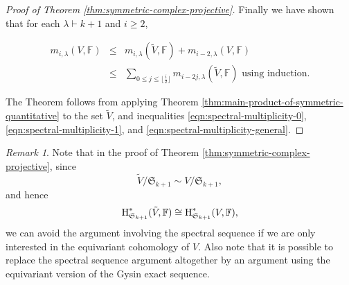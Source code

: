 \documentclass{amsart}
\theoremstyle{definition}
\theoremstyle{remark}
\newtheorem{remark}{Remark}
\numberwithin{equation}{section}
\begin{document}
\begin{proof}[Proof of Theorem \ref{thm:symmetric-complex-projective}]
Finally we have shown that for each $\lambda \vdash k+1$ and $i \geq 2$,
 
\begin{eqnarray}
\label{eqn:spectral-multiplicity-general}
 m_{i,\lambda}(V,{\mathbb{F}}) &\leq& m_{i,\lambda}(\tilde{V},{\mathbb{F}}) + m_{i-2,\lambda}(V,{\mathbb{F}})  \nonumber\\
 				&\leq& \sum_{0\leq j \leq \lfloor \frac{i}{2}\rfloor } m_{i - 2j,\lambda}(\tilde{V},{\mathbb{F}}) \mbox{ using induction}. 
\end{eqnarray}
 
The Theorem follows from applying Theorem \ref{thm:main-product-of-symmetric-quantitative} to the set $\tilde{V}$, and 
inequalities \eqref{eqn:spectral-multiplicity-0}, \eqref{eqn:spectral-multiplicity-1}, and
\eqref{eqn:spectral-multiplicity-general}.
\end{proof}

\begin{remark}
Note that in the proof of Theorem \ref{thm:symmetric-complex-projective},
since
\[
\tilde{V}/\mathfrak{S}_{k+1} \sim V/\mathfrak{S}_{k+1},
\]
and hence
\[
{\mbox{\rm H}}^*_{\mathfrak{S}_{k+1}}(\tilde{V},{\mathbb{F}}) \cong {\mbox{\rm H}}^*_{\mathfrak{S}_{k+1}}(V,{\mathbb{F}}),
\]
 we can avoid 
the argument involving the spectral sequence if we are only interested in the equivariant cohomology of $V$.
Also note that it is possible to replace the spectral sequence argument altogether
by an argument using the equivariant version of the Gysin exact sequence. 
\end{remark}
\end{document}
